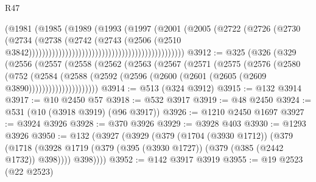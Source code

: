 \begin{lexlean}{R47}
\begin{coremodule}
                                                                  (@1981
                                                                    (@1985
                                                                      (@1989
                                                                        (@1993
                                                                          (@1997
                                                                            (@2001
                                                                              (@2005
                                                                                (@2722
                                                                                  (@2726
                                                                                    (@2730
                                                                                      (@2734
                                                                                        (@2738
                                                                                          (@2742
                                                                                            (@2743
                                                                                              (@2506
                                                                                                (@2510
                                                                                                  @3842)))))))))))))))))))))))))))))))))))))))))))))))
@3912 := @325
    (@326
      (@329
        (@2556
          (@2557
            (@2558
              (@2562
                (@2563
                  (@2567
                    (@2571
                      (@2575
                        (@2576
                          (@2580
                            (@752
                              (@2584
                                (@2588
                                  (@2592
                                    (@2596 (@2600 (@2601 (@2605 (@2609 @3890)))))))))))))))))))))
@3914 := @513 (@324 @3912)
@3915 := @132 @3914
@3917 := @10 @2450 @57
@3918 := @532 @3917
@3919 := @48 @2450
@3924 := @531 (@10 (@3918 @3919) (@96 @3917))
@3926 := @1210 @2450 @1697
@3927 := @3924 @3926
@3928 := @370 @3926
@3929 := @3928 @403
@3930 := @1293 @3926
@3950 := @132
    (@3927
      (@3929
        (@379
          (@1704 (@3930 @1712))
          (@379
            (@1718 (@3928 @1719 (@379 (@395 (@3930 @1727)) (@379 (@385 (@2442 @1732)) @398))))
            @398))))
@3952 := @142 @3917 @3919
@3955 := @19 @2523 (@22 @2523)

\end{coremodule}
\end{lexlean}
